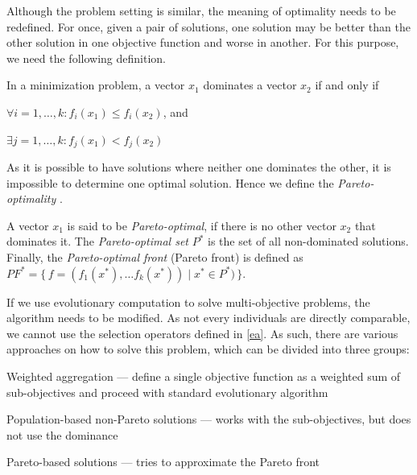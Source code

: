 Although the problem setting is similar, the meaning of optimality needs to 
be redefined. For once, given a pair of solutions, one solution may be better 
than the other solution in one objective function and worse in another. For 
this purpose, we need the following definition.

\begin{definition}[Domination]
In a minimization problem, a vector $x_1$ dominates a vector $x_2$ if and 
only if 
\begin{compactitem}
\item $\forall i=1,\ldots,k: f_i(x_1) \leq f_i(x_2)$, and
\item $\exists j=1,\ldots,k: f_j(x_1) < f_j(x_2)$
\end{compactitem}
\end{definition}

As it is possible to have solutions where neither one dominates the other,
it is impossible to determine one optimal solution. Hence we define the 
\emph{Pareto-optimality}
\citep[p.~551-561,~569--573]{Engelbrecht:2007:CII:1557464}.

\begin{definition}
A vector $x_1$ is said to be \emph{Pareto-optimal}, if there is no other vector
$x_2$ that dominates it. The \emph{Pareto-optimal set} $P^*$ is the set of all
non-dominated solutions. Finally, the \emph{Pareto-optimal front} (Pareto front)
is defined as
$PF^* =\{\, f=(f_1(x^*),\ldots f_k(x^*)) \mid x^* \in P^* ) \,\}$. 
\end{definition}

If we use evolutionary computation to solve multi-objective problems, the
algorithm needs to be modified. As not every individuals are directly
comparable, we cannot use the selection operators defined in
\ref{ea}. As such, there are various approaches on how to solve this problem,
which can be divided into three groups:

\begin{compactitem}
\item Weighted aggregation --- define a single objective function as a weighted
sum of sub-objectives and proceed with standard evolutionary algorithm
\item Population-based non-Pareto solutions --- works with the sub-objectives,
but does not use the dominance
\item Pareto-based solutions --- tries to approximate the Pareto front
\end{compactitem}

